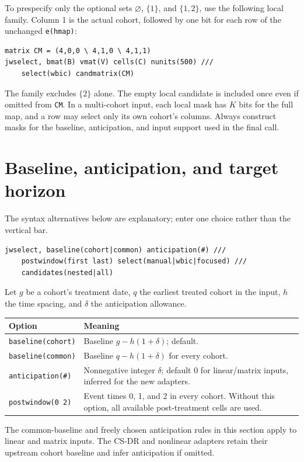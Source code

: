 \documentclass[11pt]{article}
\newcommand{\cmd}[1]{\texttt{#1}}
\begin{document}
To prespecify only the optional sets $\varnothing$, $\{1\}$, and $\{1,2\}$,
use the following local family. Column 1 is the actual cohort, followed by
one bit for each row of the unchanged \cmd{e(hmap)}:
\begin{lstlisting}
matrix CM = (4,0,0 \ 4,1,0 \ 4,1,1)
jwselect, bmat(B) vmat(V) cells(C) nunits(500) ///
    select(wbic) candmatrix(CM)
\end{lstlisting}
The family excludes $\{2\}$ alone. The empty local candidate is included
once even if omitted from \cmd{CM}. In a multi-cohort input, each local mask
has $K$ bits for the full map, and a row may select only its own cohort's
columns. Always construct masks for the baseline, anticipation, and input
support used in the final call.



\section{Baseline, anticipation, and target horizon}
The syntax alternatives below are explanatory; enter one choice rather than
the vertical bar.
\begin{lstlisting}
jwselect, baseline(cohort|common) anticipation(#) ///
    postwindow(first last) select(manual|wbic|focused) ///
    candidates(nested|all)
\end{lstlisting}
Let $g$ be a cohort's treatment date, $q$ the earliest treated cohort in the
input, $h$ the time spacing, and $\delta$ the anticipation allowance.

\begin{tabularx}{\linewidth}{@{}lX@{}}
\toprule
Option & Meaning \\
\midrule
\cmd{baseline(cohort)} & Baseline $g-h(1+\delta)$; default. \\
\cmd{baseline(common)} & Baseline $q-h(1+\delta)$ for every cohort. \\
\cmd{anticipation(\#)} & Nonnegative integer $\delta$; default 0 for linear/matrix inputs, inferred for the new adapters. \\
\cmd{postwindow(0 2)} & Event times 0, 1, and 2 in every cohort. Without this option, all available post-treatment cells are used. \\
\bottomrule
\end{tabularx}

The common-baseline and freely chosen anticipation rules in this section
apply to linear and matrix inputs. The CS-DR and nonlinear adapters retain
their upstream cohort baseline and infer anticipation if omitted.
\end{document}
